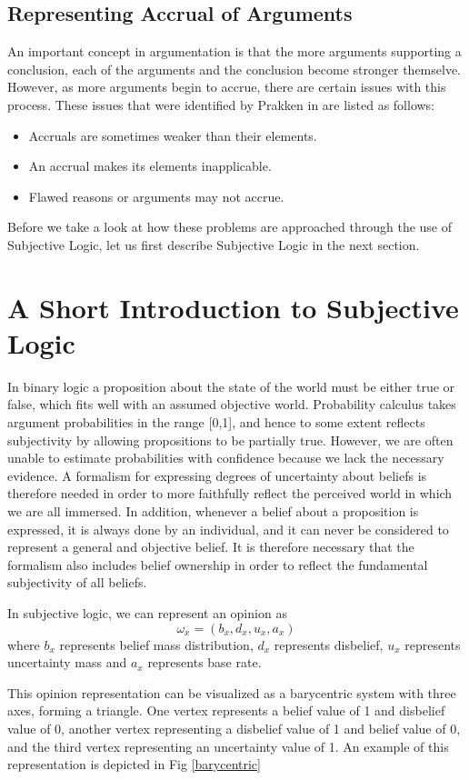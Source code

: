 \documentclass[sigconf]{acmart}
\newcommand{\opinion}[5]{$$\omega_{#1} = (#2, #3, #4, #5)$$}
\begin{document}
\subsection{Representing Accrual of Arguments}
An important concept in argumentation is that the more arguments supporting a conclusion, each of the arguments and the conclusion become stronger themselve. However, as more arguments begin to accrue, there are certain issues with this process. These issues that were identified by Prakken in \cite{Prakken:2005:SAA:1165485.1165500} are listed as follows:
\begin{itemize}
  \item Accruals are sometimes weaker than their elements.
  \item An accrual makes its elements inapplicable.
  \item Flawed reasons or arguments may not accrue.
\end{itemize}
Before we take a look at how these problems are approached through the use of Subjective Logic, let us first describe Subjective Logic in the next section.
\section{A Short Introduction to Subjective Logic}
In binary logic a proposition about the state of the world must be either true or
false, which fits well with an assumed objective world. Probability calculus takes
argument probabilities in the range [0,1], and hence to some extent reflects subjectivity by allowing propositions to be partially true. However, we are often unable to estimate probabilities with confidence because we lack the necessary evidence. A
formalism for expressing degrees of uncertainty about beliefs is therefore needed in
order to more faithfully reflect the perceived world in which we are all immersed.
In addition, whenever a belief about a proposition is expressed, it is always done by
an individual, and it can never be considered to represent a general and objective
belief. It is therefore necessary that the formalism also includes belief ownership in
order to reflect the fundamental subjectivity of all beliefs.\cite{josang2016subjective}

In subjective logic, we can represent an opinion as \opinion{x}{b_x}{d_x}{u_x}{a_x} where $b_x$ represents belief mass distribution, $d_x$ represents disbelief, $u_x$ represents uncertainty mass and $a_x$ represents base rate. 

This opinion representation can be visualized as a barycentric system with three axes, forming a triangle. One vertex represents a belief value of 1 and disbelief value of 0, another vertex representing a disbelief value of 1 and belief value of 0, and the third vertex representing an uncertainty value of 1. An example of this representation is depicted in Fig \ref{barycentric}
\end{document}

